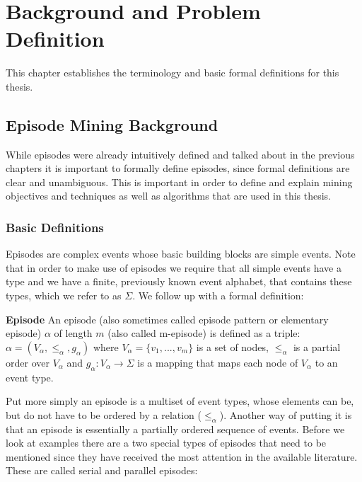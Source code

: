 \chapter{Background and Problem Definition}
\label{chapter_background}

\ifpdf
    \graphicspath{{Chapter3/Figs/Raster/}{Chapter3/Figs/PDF/}{Chapter3/Figs/}}
\else
    \graphicspath{{Chapter3/Figs/Vector/}{Chapter3/Figs/}}
\fi

This chapter establishes the terminology and basic formal definitions for this thesis.

\section{Episode Mining Background}
\label{sec_episodeMiningBackground}

While episodes were already intuitively defined and talked about in the previous chapters it is important to formally define episodes, since formal definitions are clear and unambiguous. This is important in order to define and explain mining objectives and techniques as well as algorithms that are used in this thesis. 

\subsection{Basic Definitions}
\label{subsec_basicEpisodeDefinitions}
Episodes are complex events whose basic building blocks are simple events. Note that  in order to make use of episodes we require that all simple events have a type and we have a finite, previously known event alphabet, that contains these types, which we refer to as $\Sigma$. We follow up with a formal definition:

\begin{mydef}
\label{def_episode}
\textbf{Episode} An episode (also sometimes called episode pattern or elementary episode) $\alpha$ of length $m$ (also called m-episode) is defined as a triple: $\alpha = (V_\alpha,{\leq}_{\alpha},g_\alpha)$ where $V_\alpha = \{v_1,...,v_m\}$ is a set of nodes, ${\leq}_{\alpha}$ is a partial order over $V_\alpha$ and $g_\alpha : V_\alpha \rightarrow \Sigma$ is a mapping that maps each node of $V_\alpha$ to an event type. \cite{mannila1995discovering}
\end{mydef}

Put more simply an episode is a multiset of event types, whose elements can be, but do not have to be ordered by a relation (${\leq}_{\alpha}$). Another way of putting it is that an episode is essentially a partially ordered sequence of events. Before we look at examples there are a two special types of episodes that need to be mentioned since they have received the most attention in the available literature. These are called serial and parallel episodes:

